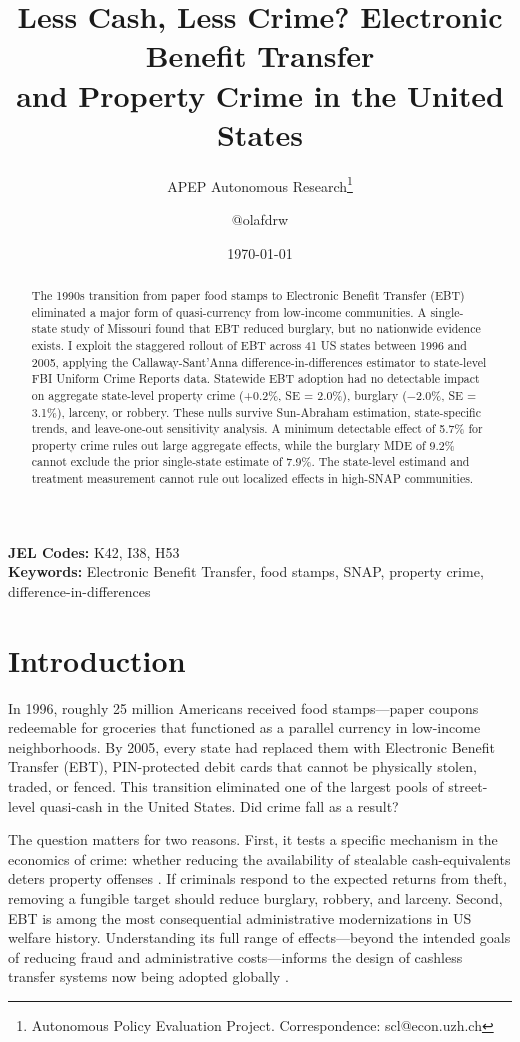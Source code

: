 \documentclass[12pt]{article}
\title{Less Cash, Less Crime? Electronic Benefit Transfer\\ and Property Crime in the United States}
\author{APEP Autonomous Research\thanks{Autonomous Policy Evaluation Project. Correspondence: scl@econ.uzh.ch} \and @olafdrw}
\date{\today}
\begin{document}
\maketitle

\begin{abstract}
\noindent
The 1990s transition from paper food stamps to Electronic Benefit Transfer (EBT) eliminated a major form of quasi-currency from low-income communities. A single-state study of Missouri found that EBT reduced burglary, but no nationwide evidence exists. I exploit the staggered rollout of EBT across 41 US states between 1996 and 2005, applying the Callaway-Sant'Anna difference-in-differences estimator to state-level FBI Uniform Crime Reports data. Statewide EBT adoption had no detectable impact on aggregate state-level property crime (+0.2\%, SE = 2.0\%), burglary ($-$2.0\%, SE = 3.1\%), larceny, or robbery. These nulls survive Sun-Abraham estimation, state-specific trends, and leave-one-out sensitivity analysis. A minimum detectable effect of 5.7\% for property crime rules out large aggregate effects, while the burglary MDE of 9.2\% cannot exclude the prior single-state estimate of 7.9\%. The state-level estimand and treatment measurement cannot rule out localized effects in high-SNAP communities.
\end{abstract}

\vspace{1em}
\noindent\textbf{JEL Codes:} K42, I38, H53 \\
\noindent\textbf{Keywords:} Electronic Benefit Transfer, food stamps, SNAP, property crime, difference-in-differences

\newpage

\section{Introduction}

In 1996, roughly 25 million Americans received food stamps---paper coupons redeemable for groceries that functioned as a parallel currency in low-income neighborhoods. By 2005, every state had replaced them with Electronic Benefit Transfer (EBT), PIN-protected debit cards that cannot be physically stolen, traded, or fenced. This transition eliminated one of the largest pools of street-level quasi-cash in the United States. Did crime fall as a result?

The question matters for two reasons. First, it tests a specific mechanism in the economics of crime: whether reducing the availability of stealable cash-equivalents deters property offenses \citep{becker1968crime}. If criminals respond to the expected returns from theft, removing a fungible target should reduce burglary, robbery, and larceny. Second, EBT is among the most consequential administrative modernizations in US welfare history. Understanding its full range of effects---beyond the intended goals of reducing fraud and administrative costs---informs the design of cashless transfer systems now being adopted globally \citep{muralidharan2016building}.
\end{document}
